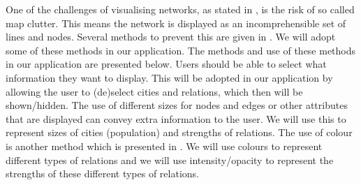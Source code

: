 One of the challenges of visualising networks, as stated in \cite{468391}, is the risk of so called map clutter. This means the network is displayed as an incomprehensible set of lines and nodes.
Several methods to prevent this are given in \cite{468391}. We will adopt some of these methods in our application. The methods and use of these methods in our application are presented below.
Users should be able to select what information they want to display. This will be adopted in our application by allowing the user to (de)select cities and relations, which then will be shown/hidden. The use of different sizes for nodes and edges or other attributes that are displayed can convey extra information to the user. We will use this to represent sizes of cities (population) and strengths of relations.
The use of colour is another method which is presented in \cite{468391}. We will use colours to represent different types of relations and we will use intensity/opacity to represent the strengths of these different types of relations.